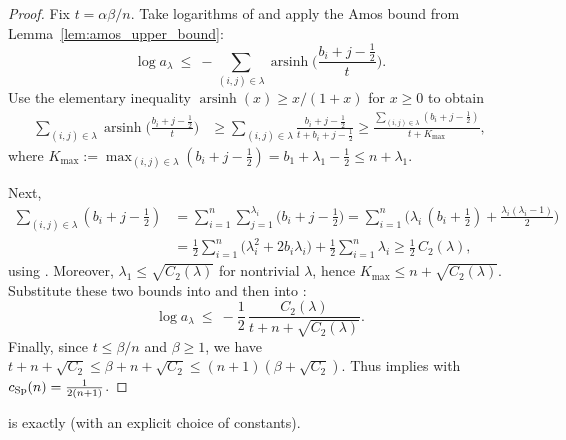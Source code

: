 \begin{proof}
Fix $t=\alpha\beta/n$.
Take logarithms of  and apply the Amos bound  from Lemma~\ref{lem:amos_upper_bound}:
\begin{equation}
\label{eq:Sp_log_bound_asinh}
\log a_{\lambda}\ \le\ -\sum_{(i,j)\in\lambda}\operatorname{arsinh}\Big(\frac{b_i+j-\tfrac12}{t}\Big).
\end{equation}
Use the elementary inequality $\operatorname{arsinh}(x)\ge x/(1+x)$ for $x\ge 0$ to obtain
\begin{align}
\sum_{(i,j)\in\lambda}\operatorname{arsinh}\Big(\frac{b_i+j-\tfrac12}{t}\Big)
&\ge \sum_{(i,j)\in\lambda}\frac{b_i+j-\tfrac12}{t+b_i+j-\tfrac12}
\ge \frac{\sum_{(i,j)\in\lambda}(b_i+j-\tfrac12)}{t+K_{\max}},
\label{eq:Sp_asinh_lower_sum}
\end{align}
where
$K_{\max}:=\max_{(i,j)\in\lambda}(b_i+j-\tfrac12)=b_1+\lambda_1-\tfrac12\le n+\lambda_1$.

Next,
\begin{align*}
\sum_{(i,j)\in\lambda}(b_i+j-\tfrac12)
&=\sum_{i=1}^n\sum_{j=1}^{\lambda_i}\Big(b_i+j-\tfrac12\Big)
=\sum_{i=1}^n\Big(\lambda_i\,(b_i+\tfrac12)+\frac{\lambda_i(\lambda_i-1)}{2}\Big)
\\
&=\frac12\sum_{i=1}^n\big(\lambda_i^2+2b_i\lambda_i\big)+\frac12\sum_{i=1}^n\lambda_i
\ge \frac12\,C_2(\lambda),
\end{align*}
using .
Moreover, $\lambda_1\le \sqrt{C_2(\lambda)}$ for nontrivial $\lambda$, hence
$K_{\max}\le n+\sqrt{C_2(\lambda)}$.
Substitute these two bounds into  and then into :
\begin{equation}
\label{eq:Sp_log_bound_final}
\log a_{\lambda}\ \le\ -\frac12\,\frac{C_2(\lambda)}{t+n+\sqrt{C_2(\lambda)}}.
\end{equation}
Finally, since $t\le \beta/n$ and $\beta\ge 1$, we have
$t+n+\sqrt{C_2}\le \beta+n+\sqrt{C_2}\le (n+1)(\beta+\sqrt{C_2})$.
Thus  implies  with
$c_{\mathrm{Sp}}(n)=\frac{1}{2(n+1)}$.
\end{proof}

\begin{remark}[Conclusion]
 is exactly  (with an explicit choice of constants).
\end{remark}

